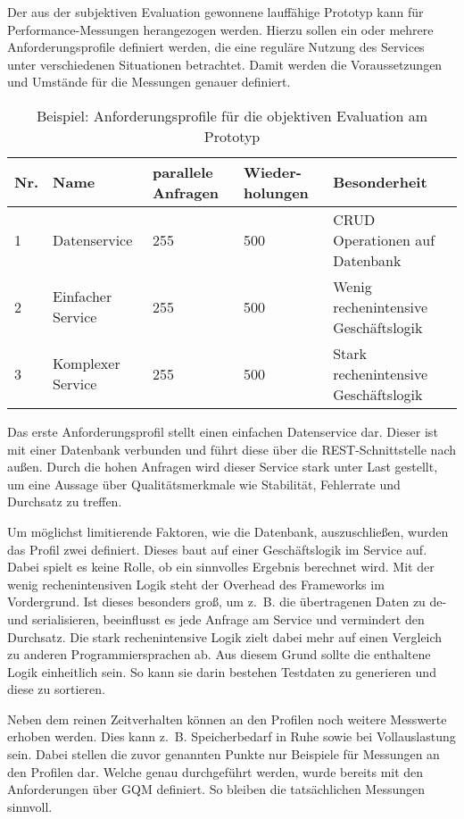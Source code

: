 Der aus der subjektiven Evaluation gewonnene lauffähige Prototyp kann für Performance-Messungen herangezogen werden. Hierzu sollen ein oder mehrere Anforderungsprofile definiert werden, die eine reguläre Nutzung des Services unter verschiedenen Situationen betrachtet. Damit werden die Voraussetzungen und Umstände für die Messungen genauer definiert. 

\begin{table}[!h]
	\centering
	\begin{tabular}{p{1cm}p{4cm}p{2cm}p{2cm}p{4cm}}
		\textbf{Nr.} & \textbf{Name} & \textbf{parallele Anfragen} & 
		\textbf{Wieder- holungen} & \textbf{Besonderheit} \\
		\hline
		1 	& Datenservice 			& 255	&	500		& CRUD Operationen auf Datenbank  \\
		\hline
		2	& Einfacher Service		& 255 	&	500		& Wenig rechenintensive Geschäftslogik   \\
		\hline
		3	& Komplexer Service 	& 255	&	500		& Stark rechenintensive Geschäftslogik  \\
		\hline
	\end{tabular}
	\caption[Anforderungsprofile]{Beispiel: Anforderungsprofile für die objektiven Evaluation am Prototyp}
	\label{Anforderungsprofile}
\end{table}

Das erste Anforderungsprofil stellt einen einfachen Datenservice dar. Dieser ist mit einer Datenbank verbunden und führt diese über die \ac{REST}-Schnittstelle nach außen. Durch die hohen Anfragen wird dieser Service stark unter Last gestellt, um eine Aussage über Qualitätsmerkmale wie Stabilität, Fehlerrate und Durchsatz zu treffen.

Um möglichst limitierende Faktoren, wie die Datenbank, auszuschließen, wurden das Profil zwei definiert. Dieses baut auf einer Geschäftslogik im Service auf. Dabei spielt es keine Rolle, ob ein sinnvolles Ergebnis berechnet wird. Mit der wenig rechenintensiven Logik steht der Overhead des Frameworks im Vordergrund. Ist dieses besonders groß, um z.~B. die übertragenen Daten zu de- und serialisieren, beeinflusst es jede Anfrage am Service und vermindert den Durchsatz. Die stark rechenintensive Logik zielt dabei mehr auf einen Vergleich zu anderen Programmiersprachen ab. Aus diesem Grund sollte die enthaltene Logik einheitlich sein. So kann sie darin bestehen Testdaten zu generieren und diese zu sortieren.

Neben dem reinen Zeitverhalten können an den Profilen noch weitere Messwerte erhoben werden. Dies kann z.~B. Speicherbedarf in Ruhe sowie bei Vollauslastung sein. Dabei stellen die zuvor genannten Punkte nur Beispiele für Messungen an den Profilen dar. Welche genau durchgeführt werden, wurde bereits mit den Anforderungen über \ac{GQM} definiert. So bleiben die tatsächlichen Messungen sinnvoll.

